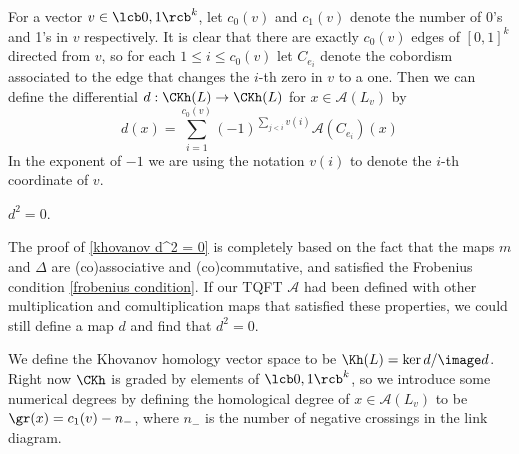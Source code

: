 For a vector $v \in \lcb 0,1 \rcb^k$, let $c_0(v)$ and $c_1(v)$ denote the number of 0's and 1's in $v$ respectively. It is clear that there are exactly $c_0(v)$ edges of $[0,1]^k$ directed from $v$, so for each $1 \leq i \leq c_0(v)$ let $C_{e_i}$ denote the cobordism associated to the edge that changes the $i$-th zero in $v$ to a one. Then we can define the differential $d : \CKh(L) \rightarrow \CKh(L)$ for $x \in \mathcal A(L_v)$ by
\begin{equation}
\label{khovanov d}
d(x) = \sum_{i=1}^{c_0(v)} (-1)^{\sum_{j<i} v(i)} \mathcal A(C_{e_i})(x)
\end{equation}
In the exponent of $-1$ we are using the notation $v(i)$ to denote the $i$-th coordinate of $v$. 

\begin{prop}
\label{khovanov d^2 = 0}
$d^2 = 0$.
\end{prop}

The proof of \ref{khovanov d^2 = 0} is completely based on the fact that the maps $m$ and $\Delta$ are (co)associative and (co)commutative, and satisfied the Frobenius condition \eqref{frobenius condition}. If our TQFT $\mathcal A$ had been defined with other multiplication and comultiplication maps that satisfied these properties, we could still define a map $d$ and find that $d^2 = 0$.

We define the Khovanov homology vector space to be $\Kh(L) = \ker d / \image d$. Right now $\CKh$ is graded by elements of $\lcb 0,1 \rcb^k$, so we introduce some numerical degrees by defining the homological degree of $x \in \mathcal A(L_v)$ to be $\gr(x) = c_1(v) - n_-$, where $n_-$ is the number of negative crossings in the link diagram. 

